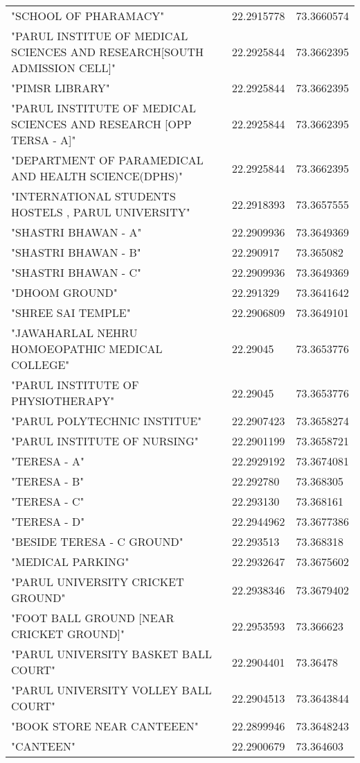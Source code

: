 \begin{center}
\begin{longtable}{|l|l|l|}
"SCHOOL OF PHARAMACY" & 22.2915778 & 73.3660574 \\
"PARUL INSTITUE OF MEDICAL SCIENCES AND RESEARCH[SOUTH ADMISSION CELL]" & 22.2925844 & 73.3662395 \\
"PIMSR LIBRARY" & 22.2925844 & 73.3662395 \\
"PARUL INSTITUTE OF MEDICAL SCIENCES AND RESEARCH [OPP TERSA - A]" & 22.2925844 & 73.3662395 \\
"DEPARTMENT OF PARAMEDICAL AND HEALTH SCIENCE(DPHS)" & 22.2925844 & 73.3662395 \\
"INTERNATIONAL STUDENTS HOSTELS , PARUL UNIVERSITY" & 22.2918393 & 73.3657555 \\
"SHASTRI BHAWAN - A" & 22.2909936 & 73.3649369 \\
"SHASTRI BHAWAN - B" & 22.290917 & 73.365082 \\
"SHASTRI BHAWAN - C" & 22.2909936 & 73.3649369 \\
"DHOOM GROUND" & 22.291329 & 73.3641642 \\
"SHREE SAI TEMPLE" & 22.2906809 & 73.3649101 \\
"JAWAHARLAL NEHRU HOMOEOPATHIC MEDICAL COLLEGE" & 22.29045 & 73.3653776 \\
"PARUL INSTITUTE OF PHYSIOTHERAPY" & 22.29045 & 73.3653776 \\
"PARUL POLYTECHNIC INSTITUE" & 22.2907423 & 73.3658274 \\
"PARUL INSTITUTE OF NURSING" & 22.2901199 & 73.3658721 \\
"TERESA - A" & 22.2929192 & 73.3674081 \\
"TERESA - B" & 22.292780 & 73.368305 \\
"TERESA - C" & 22.293130 & 73.368161 \\
"TERESA - D" & 22.2944962 & 73.3677386 \\
"BESIDE TERESA - C GROUND" & 22.293513 & 73.368318 \\
"MEDICAL PARKING" & 22.2932647 & 73.3675602 \\
"PARUL UNIVERSITY CRICKET GROUND" & 22.2938346 & 73.3679402 \\
"FOOT BALL GROUND [NEAR CRICKET GROUND]" & 22.2953593 & 73.366623 \\
"PARUL UNIVERSITY BASKET BALL COURT" & 22.2904401 & 73.36478 \\
"PARUL UNIVERSITY VOLLEY BALL COURT" & 22.2904513 & 73.3643844 \\
"BOOK STORE NEAR CANTEEEN" & 22.2899946 & 73.3648243 \\
"CANTEEN" & 22.2900679 & 73.364603 \\

\end{longtable}
\end{center}
